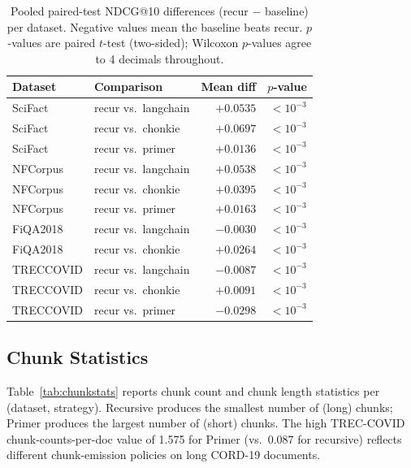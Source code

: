 \documentclass[conference]{IEEEtran}
\begin{document}
\begin{table}[!t]
\caption{Pooled paired-test NDCG@10 differences (recur $-$ baseline) per dataset. Negative values mean the baseline beats recur. $p$-values are paired $t$-test (two-sided); Wilcoxon $p$-values agree to 4 decimals throughout.}
\label{tab:sig}
\centering
\setlength{\tabcolsep}{4pt}
\begin{tabular}{llrr}
\toprule
Dataset & Comparison & Mean diff & $p$-value \\
\midrule
SciFact   & recur vs.\ langchain & $+0.0535$ & $< 10^{-3}$ \\
SciFact   & recur vs.\ chonkie   & $+0.0697$ & $< 10^{-3}$ \\
SciFact   & recur vs.\ primer    & $+0.0136$ & $< 10^{-3}$ \\
NFCorpus  & recur vs.\ langchain & $+0.0538$ & $< 10^{-3}$ \\
NFCorpus  & recur vs.\ chonkie   & $+0.0395$ & $< 10^{-3}$ \\
NFCorpus  & recur vs.\ primer    & $+0.0163$ & $< 10^{-3}$ \\
FiQA2018  & recur vs.\ langchain & $-0.0030$ & $< 10^{-3}$ \\
FiQA2018  & recur vs.\ chonkie   & $+0.0264$ & $< 10^{-3}$ \\
TRECCOVID & recur vs.\ langchain & $-0.0087$ & $< 10^{-3}$ \\
TRECCOVID & recur vs.\ chonkie   & $+0.0091$ & $< 10^{-3}$ \\
TRECCOVID & recur vs.\ primer    & $-0.0298$ & $< 10^{-3}$ \\
\bottomrule
\end{tabular}
\end{table}

\subsection{Chunk Statistics}
\label{sec:chunkstats}

Table~\ref{tab:chunkstats} reports chunk count and chunk length statistics
per (dataset, strategy). Recursive produces the smallest number of (long)
chunks; Primer produces the largest number of (short) chunks. The high
TREC-COVID chunk-counts-per-doc value of 1.575 for Primer (vs.\ 0.087 for
recursive) reflects different chunk-emission policies on long CORD-19
documents.
\end{document}
